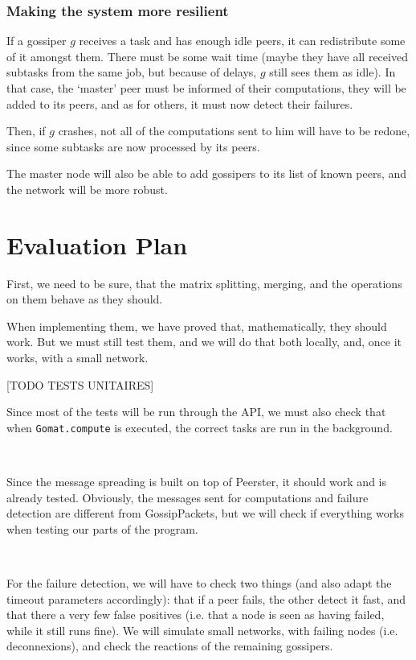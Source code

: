 \documentclass[a4paper,12pt]{article}
\begin{document}
    \subsubsection{Making the system more resilient}
    If a gossiper $g$ receives a task and has enough idle peers, it can redistribute some of it amongst them. There must be some wait time (maybe they have all received subtasks from the same job, but because of delays, $g$ still sees them as idle).
In that case, the ‘master’ peer must be informed of their computations, they will be added to its peers, and as for others, it must now detect their failures.

    Then, if $g$ crashes, not all of the computations sent to him will have to be redone, since some subtasks are now processed by its peers.

    The master node will also be able to add gossipers to its list of known peers, and the network will be more robust.

    \section{Evaluation Plan}
    First, we need to be sure, that the matrix splitting, merging, and the operations on them behave as they should.

    When implementing them, we have proved that, mathematically, they should work. But we must still test them, and we will do that both locally, and, once it works, with a small network.
    
    [TODO TESTS UNITAIRES]
    
    Since most of the tests will be run through the API, we must also check that when \texttt{Gomat.compute} is executed, the correct tasks are run in the background.

~~
    
    Since the message spreading is built on top of Peerster, it should work and is already tested. Obviously, the messages sent for computations and failure detection are different from GossipPackets, but we will check if everything works when testing our parts of the program.
    
~~
    
    For the failure detection, we will have to check two things (and also adapt the timeout parameters accordingly): that if a peer fails, the other detect it fast, and that there a very few false positives (i.e. that a node is seen as having failed, while it still runs fine). We will simulate small networks, with failing nodes (i.e. deconnexions), and check the reactions of the remaining gossipers.
    
\end{document}
